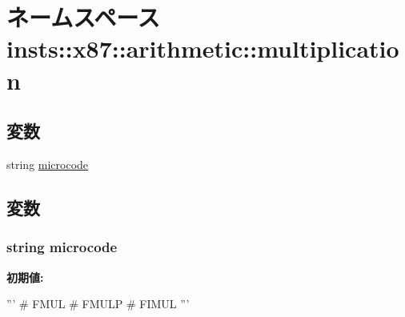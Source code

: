 \hypertarget{namespaceinsts_1_1x87_1_1arithmetic_1_1multiplication}{
\section{ネームスペース insts::x87::arithmetic::multiplication}
\label{namespaceinsts_1_1x87_1_1arithmetic_1_1multiplication}
}
\subsection*{変数}
\begin{DoxyCompactItemize}
\item 
string \hyperlink{namespaceinsts_1_1x87_1_1arithmetic_1_1multiplication_a770f11a173e99389a8802f0107ed8f52}{microcode}
\end{DoxyCompactItemize}


\subsection{変数}
\hypertarget{namespaceinsts_1_1x87_1_1arithmetic_1_1multiplication_a770f11a173e99389a8802f0107ed8f52}{
\subsubsection[{microcode}]{\setlength{\rightskip}{0pt plus 5cm}string {\bf microcode}}}
\label{namespaceinsts_1_1x87_1_1arithmetic_1_1multiplication_a770f11a173e99389a8802f0107ed8f52}
{\bfseries 初期値:}
\begin{DoxyCode}
'''
# FMUL
# FMULP
# FIMUL
'''
\end{DoxyCode}
